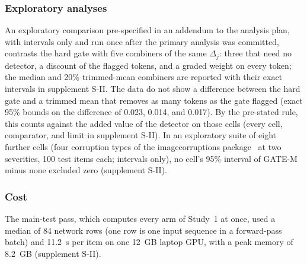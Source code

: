 \subsubsection{Exploratory analyses}
An exploratory comparison pre-specified in an addendum to the analysis plan, with intervals only and run once after the primary
analysis was committed, contrasts the hard gate with five combiners of the same $\Delta_j$: three that need no detector, a discount of
the flagged tokens, and a graded weight on every token; the median and 20\% trimmed-mean combiners are reported with their exact
intervals in supplement S-II.
The data do not show a difference between the hard gate and a trimmed mean that removes as many tokens as the gate flagged (exact 95\%
bounds on the difference of 0.023, 0.014, and 0.017).
By the pre-stated rule, this counts against the added value of the detector on those cells (every cell, comparator, and limit in
supplement S-II).
In an exploratory suite of eight further cells (four corruption types of the imagecorruptions package~\cite{michaelis2019imagecorruptions}
at two severities, 100 test items each; intervals only), no cell's 95\% interval of GATE-M minus none excluded zero (supplement S-II).

\subsubsection{Cost}
The main-test pass, which computes every arm of Study~1 at once, used a median of 84 network rows (one row is one input sequence in a forward-pass batch) and 11.2~s per item on one
12~GB laptop GPU, with a peak memory of 8.2~GB (supplement S-II).

